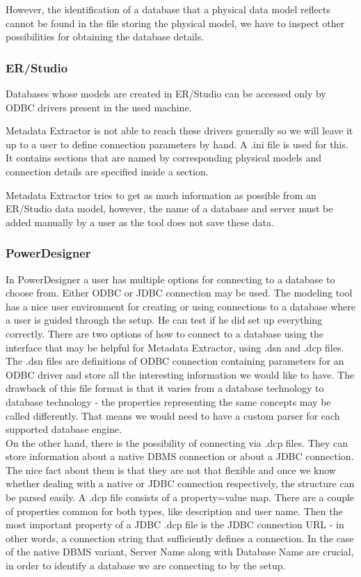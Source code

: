 However, the identification of a database that a physical data model reflects cannot be found in the file storing the physical model, we have to inspect other possibilities for obtaining the database details.

\subsubsection{ER/Studio}

Databases whose models are created in ER/Studio can be accessed only by ODBC drivers present in the used machine.

Metadata Extractor is not able to reach these drivers generally so we will leave it up to a user to define connection parameters by hand.
A .ini file \label{ini_connections}is used for this. It contains sections that are named by corresponding physical models and connection details are specified inside a section. 

Metadata Extractor tries to get as much information as possible from an ER/Studio data model, however, the name of a database and server must be added manually by a user as the tool does not save these data.

\subsubsection{PowerDesigner}

In PowerDesigner a user has multiple options for connecting to a database to choose from. Either ODBC or JDBC connection may be used. 
The modeling tool has a nice user environment for creating or using connections to a database where a user is guided through the setup. He can test if he did set up everything correctly. 
There are two options of how to connect to a database using the interface that may be helpful for Metadata Extractor, using .dsn and .dcp files.\\

The .dsn files are definitions of ODBC connection containing parameters for an ODBC driver and store all the interesting information we would like to have. 
The drawback of this file format is that it varies from a database technology to database technology - the properties representing the same concepts may be called differently. That means we would need to have a custom parser for each supported database engine. \\

On the other hand, there is the possibility of connecting via .dcp files. They can store information about a native DBMS connection or about a JDBC connection. 
The nice fact about them is that they are not that flexible and once we know whether dealing with a native or JDBC connection respectively, the structure can be parsed easily. 
A .dcp file consists of a property=value map.
There are a couple of properties common for both types, like description and user name.
Then the most important property of a JDBC .dcp file is the JDBC connection URL - in other words, a connection string that sufficiently defines a connection.
In the case of the native DBMS variant, Server Name along with Database Name are crucial, in order to identify a database we are connecting to by the setup.

